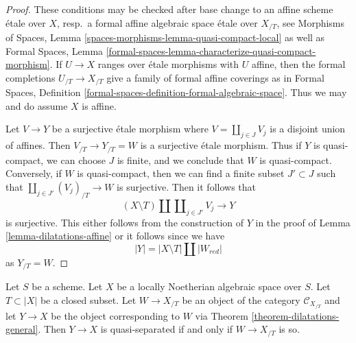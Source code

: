 \begin{proof}
These conditions may be checked after base change to an affine
scheme \'etale over $X$, resp.\ a formal affine algebraic space
\'etale over $X_{/T}$, see
Morphisms of Spaces, Lemma \ref{spaces-morphisms-lemma-quasi-compact-local}
as well as Formal Spaces, Lemma
\ref{formal-spaces-lemma-characterize-quasi-compact-morphism}.
If $U \to X$ ranges over \'etale morphisms with $U$ affine, then
the formal completions $U_{/T} \to X_{/T}$ give a family
of formal affine coverings as in Formal Spaces, Definition
\ref{formal-spaces-definition-formal-algebraic-space}.
Thus we may and do assume $X$ is affine.

\medskip\noindent
Let $V \to Y$ be a surjective \'etale morphism
where $V = \coprod_{j \in J} V_j$ is a disjoint union of affines. Then
$V_{/T} \to Y_{/T} = W$ is a surjective \'etale morphism.
Thus if $Y$ is quasi-compact, we can choose $J$ is finite, and
we conclude that $W$ is quasi-compact. Conversely, if $W$ is
quasi-compact, then we can find a finite subset $J' \subset J$
such that $\coprod_{j \in J'} (V_j)_{/T} \to W$ is surjective.
Then it follows that
$$
(X \setminus T) \amalg \coprod\nolimits_{j \in J'} V_j \longrightarrow Y
$$
is surjective. This either follows from the construction of
$Y$ in the proof of Lemma \ref{lemma-dilatations-affine}
or it follows since we have
$$
|Y| = |X \setminus T| \amalg |W_{red}|
$$
as $Y_{/T} = W$.
\end{proof}

\begin{lemma}
\label{lemma-output-quasi-separated}
Let $S$ be a scheme. Let $X$ be a locally Noetherian algebraic space over $S$.
Let $T \subset |X|$ be a closed subset. Let $W \to X_{/T}$ be an object
of the category $\mathcal{C}_{X_{/T}}$ and let $Y \to X$ be the object
corresponding to $W$ via Theorem \ref{theorem-dilatations-general}.
Then $Y \to X$ is quasi-separated if and only if $W \to X_{/T}$ is so.
\end{lemma}

